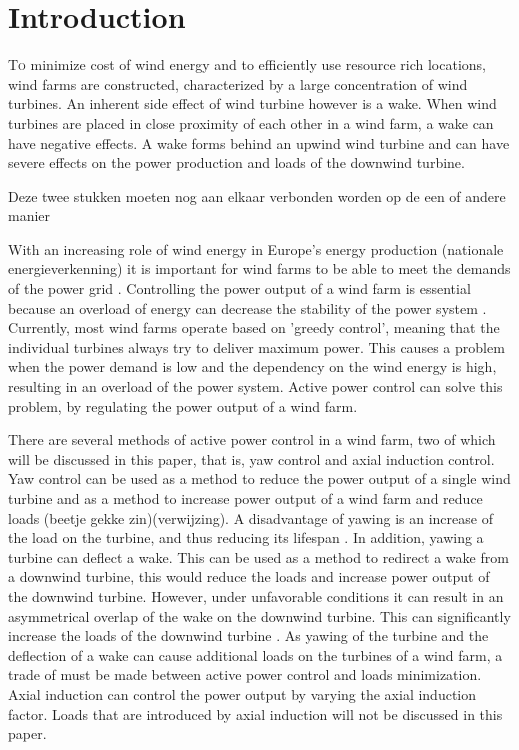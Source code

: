 \section{Introduction}
	
\lettrine[nindent=0em,lines=3]To minimize cost of wind energy and to efficiently use resource rich locations, wind farms are constructed, characterized by a large concentration of wind turbines. An inherent side effect of wind turbine however is a wake. When wind turbines are placed in close proximity of each other in a wind farm, a wake can have negative effects. A wake forms behind an upwind wind turbine and can have severe effects on the power production and loads of the downwind turbine. 

Deze twee stukken moeten nog aan elkaar verbonden worden op de een of andere manier

With an increasing role of wind energy in Europe's energy production (nationale energieverkenning) it is important for wind farms to be able to meet the demands of the power grid \cite{Tande2003}. Controlling the power output of a wind farm is essential because an overload of energy can decrease the stability of the power system \cite{Tande2003}. Currently, most wind farms operate based on 'greedy control', meaning that the individual turbines always try to deliver maximum power. This causes a problem when the power demand is low and the dependency on the wind energy is high, resulting in an overload of the power system. Active power control can solve this problem, by regulating the power output of a wind farm.

There are several methods of active power control in a wind farm, two of which will be discussed in this paper, that is, yaw control and axial induction control. Yaw control can be used as a method to reduce the power output of a single wind turbine and as a method to increase power output of a wind farm and reduce loads (beetje gekke zin)(verwijzing). A disadvantage of yawing is an increase of the load on the turbine, and thus reducing its lifespan \cite{Zalkind2016,Kanev2017}. In addition, yawing a turbine can deflect a wake. This can be used as a method to redirect a wake from a downwind turbine, this would reduce the loads and increase power output of the downwind turbine. However, under unfavorable conditions it can result in an asymmetrical overlap of the wake on the downwind turbine. This can significantly increase the loads of the downwind turbine \cite{Wilson2017,Dijk2016,Bastankhah2016}. As yawing of the turbine and the deflection of a wake can cause additional loads on the turbines of a wind farm, a trade of must be made between active power control and loads minimization. Axial induction can control the power output by varying the axial induction factor. Loads that are introduced by axial induction will not be discussed in this paper. 

